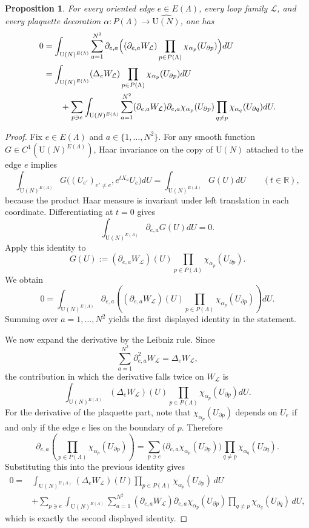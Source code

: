 \documentclass[11pt,a4paper,reqno]{article}
\newtheorem{proposition}[theorem]{Proposition}
\theoremstyle{definition}
\theoremstyle{remark}
\newcommand\U{{\mathrm U}}
\newcommand\Lc{{\mathcal{L}}}
\begin{document}
\begin{proposition}
\label{prop:first-order-haar-ibp}
For every oriented edge $e\in E(\Lambda)$, every loop family $\Lc$, and every plaquette decoration
$\alpha:P(\Lambda)\to \widehat{\U(N)}$, one has
\begin{align}
0 &= \int_{\U(N)^{E(\Lambda)}}\sum_{a=1}^{N^2}\partial_{e,a}\Bigl((\partial_{e,a}W_{\Lc})\prod_{p\in P(\Lambda)}\chi_{\alpha_p}(U_{\partial p})\Bigr) dU \notag \\
&=\int_{\U(N)^{E(\Lambda)}}(\Delta_e W_{\Lc})\prod_{p\in P(\Lambda)}\chi_{\alpha_p}(U_{\partial p}) dU\notag \\
&\qquad+\sum_{p\ni e}\int_{\U(N)^{E(\Lambda)}}\sum_{a=1}^{N^2}(\partial_{e,a}W_{\Lc})\partial_{e,a}\chi_{\alpha_p}(U_{\partial p})\prod_{q\neq p}\chi_{\alpha_q}(U_{\partial q}) dU.\label{eq:first-order-coefficientwise-ibp}
\end{align}
\end{proposition}

\begin{proof}
Fix $e\in E(\Lambda)$ and $a\in\{1,\dots,N^2\}$. For any smooth function $G\in C^1(\U(N)^{E(\Lambda)})$, Haar invariance on the copy of $\U(N)$ attached to the edge $e$ implies
\[
\int_{\U(N)^{E(\Lambda)}} G\bigl((U_{e'})_{e'\neq e},e^{tX_a}U_e\bigr)dU = \int_{\U(N)^{E(\Lambda)}} G(U)dU \qquad (t\in\mathbb R),
\]
because the product Haar measure is invariant under left translation in each coordinate. Differentiating at $t=0$ gives
\[
\int_{\U(N)^{E(\Lambda)}} \partial_{e,a}G(U)dU=0.
\]
Apply this identity to
\[
G(U):=(\partial_{e,a}W_{\Lc})(U)\prod_{p\in P(\Lambda)}\chi_{\alpha_p}(U_{\partial p}).
\]
We obtain
\[
0=
\int_{\U(N)^{E(\Lambda)}}\partial_{e,a}\left((\partial_{e,a}W_{\Lc})(U)\prod_{p\in P(\Lambda)}\chi_{\alpha_p}(U_{\partial p})\right)dU.
\]
Summing over $a=1,\dots,N^2$ yields the first displayed identity in the statement.

We now expand the derivative by the Leibniz rule. Since
\[
\sum_{a=1}^{N^2}\partial_{e,a}^2W_{\Lc}=\Delta_e W_{\Lc},
\]
the contribution in which the derivative falls twice on $W_{\Lc}$ is
\[
\int_{\U(N)^{E(\Lambda)}} (\Delta_eW_{\Lc})(U)\prod_{p\in P(\Lambda)}\chi_{\alpha_p}(U_{\partial p})dU.
\]
For the derivative of the plaquette part, note that $\chi_{\alpha_p}(U_{\partial p})$ depends on
$U_e$ if and only if the edge $e$ lies on the boundary of $p$. Therefore
\[
\partial_{e,a}\left(\prod_{p\in P(\Lambda)}\chi_{\alpha_p}(U_{\partial p})\right) =\sum_{p\ni e}\bigl(\partial_{e,a}\chi_{\alpha_p}(U_{\partial p})\bigr) \prod_{q\neq p}\chi_{\alpha_q}(U_{\partial q}).
\]
Substituting this into the previous identity gives
\begin{align*}
0={}&\int_{\U(N)^{E(\Lambda)}}
(\Delta_eW_{\Lc})(U)
\prod_{p\in P(\Lambda)}\chi_{\alpha_p}(U_{\partial p})\,dU\\
&+\sum_{p\ni e}\int_{\U(N)^{E(\Lambda)}}
\sum_{a=1}^{N^2}(\partial_{e,a}W_{\Lc})
\partial_{e,a}\chi_{\alpha_p}(U_{\partial p})
\prod_{q\neq p}\chi_{\alpha_q}(U_{\partial q})\,dU,
\end{align*}
which is exactly the second displayed identity.
\end{proof}
\end{document}
